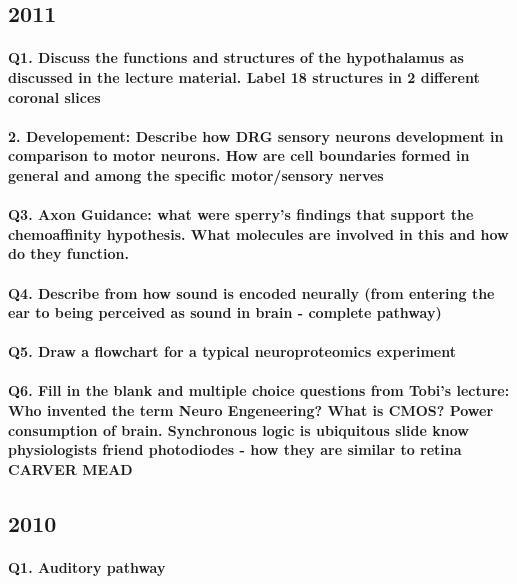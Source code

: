 \documentclass[12pt,article,oneside,a4paper]{memoir}
\begin{document}
\subsection{2011}

\paragraph{Q1. Discuss the functions and structures of the hypothalamus as
discussed in the lecture material. Label 18 structures in 2 different coronal slices}
\paragraph{2. Developement: Describe how DRG sensory neurons development in comparison to motor neurons. How are cell boundaries formed in general and among the specific motor/sensory nerves}
\paragraph{Q3. Axon Guidance: what were sperry's findings that support the chemoaffinity
hypothesis. What molecules are involved in this and how do they function.}
\paragraph{Q4. Describe from how sound is encoded neurally (from entering the ear
to being perceived as sound in brain - complete pathway)}
\paragraph{Q5. Draw a flowchart for a typical neuroproteomics experiment}
\paragraph{Q6. Fill in the blank and multiple choice questions from Tobi's lecture: Who invented the term Neuro Engeneering? What is CMOS? Power consumption of brain. Synchronous logic is ubiquitous slide know physiologists friend photodiodes - how they are similar to retina CARVER MEAD}


\subsection{2010}
\paragraph{Q1. Auditory pathway}
\end{document}
